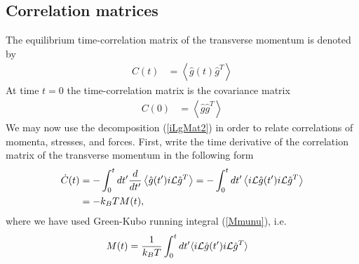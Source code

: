 \documentclass[b5paper,openright,10pt]{book}
\newcommand{\esc}{\!\cdot\!}
\newcommand{\llangle}{\left\langle}
\newcommand{\rrangle}{\right\rangle}
\begin{document}
\subsection{Correlation matrices}
The equilibrium time-correlation matrix of the transverse momentum is denoted by
\begin{align}
  C(t) &=  \llangle \hat{g}(t) \hat{g}^T \rrangle
\end{align}
At time  $t=0$ the time-correlation matrix is the covariance matrix
\begin{align}
C(0)&=   \llangle \hat{g}\hat{g}^T\rrangle 
\label{cov}
\end{align}
We may  now use  the decomposition (\ref{iLgMat2})  in order  to relate
correlations of momenta, stresses, and  forces. First, write the time
derivative of the correlation matrix of the transverse momentum in the
following form
\begin{align}
\dot{C}(t)&=  -\int_0^t dt' \frac{d}{dt'}\llangle \hat{g}(t') i{\cal L}\hat{g}^T\rrangle
=-  \int_0^t dt' \llangle i{\cal L}\hat{g}(t') i{\cal L}\hat{g}^T\rrangle
\nonumber\\
&=-  k_BT M(t),
\label{dCMt}
\end{align}
where we have used Green-Kubo running integral (\ref{Mmunu}), i.e.
\begin{align}
M(t)&= \frac{1}{k_BT}\int_0^t dt'\langle i{\cal L}\hat{g}(t')i{\cal L} \hat{g}^T\rangle
\label{Mmunut}
\end{align}
\end{document}
